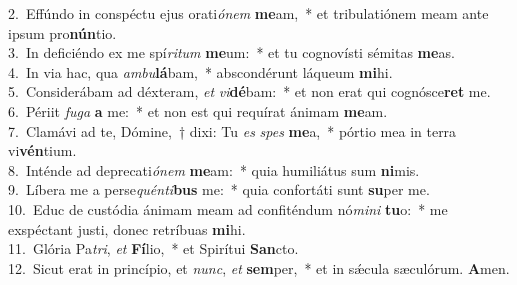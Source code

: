 {2.~}Effúndo in conspéctu ejus orati\textit{ó}\textit{nem} \textbf{me}am,~* et tribulatiónem meam ante ipsum pro\textbf{nún}tio.\\
{3.~}In deficiéndo ex me spí\textit{ri}\textit{tum} \textbf{me}um:~* et tu cognovísti sémitas \textbf{me}as.\\
{4.~}In via hac, qua \textit{am}\textit{bu}\textbf{lá}bam,~* abscondérunt láqueum \textbf{mi}hi.\\
{5.~}Considerábam ad déxteram, \textit{et} \textit{vi}\textbf{dé}bam:~* et non erat qui cognósce\textbf{ret} me.\\
{6.~}Périit \textit{fu}\textit{ga} \textbf{a} me:~* et non est qui requírat ánimam \textbf{me}am.\\
{7.~}Clamávi ad te, Dómine,~† dixi: Tu \textit{es} \textit{spes} \textbf{me}a,~* pórtio mea in terra vi\textbf{vén}tium.\\
{8.~}Inténde ad deprecati\textit{ó}\textit{nem} \textbf{me}am:~* quia humiliátus sum \textbf{ni}mis.\\
{9.~}Líbera me a perse\textit{quén}\textit{ti}\textbf{bus} me:~* quia confortáti sunt \textbf{su}per me.\\
{10.~}Educ de custódia ánimam meam ad confiténdum nó\textit{mi}\textit{ni} \textbf{tu}o:~* me exspéctant justi, donec retríbuas \textbf{mi}hi.\\
{11.~}Glória Pa\textit{tri}, \textit{et} \textbf{Fí}lio,~* et Spirítui \textbf{San}cto.\\
{12.~}Sicut erat in princípio, et \textit{nunc}, \textit{et} \textbf{sem}per,~* et in sǽcula sæculórum. \textbf{A}men.\\
